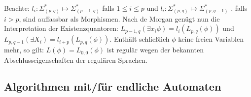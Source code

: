 \documentclass[12pt, a4paper]{article}
\begin{document}
\begin{itemize}
		\subitem Beachte: $l_{i}: \Sigma^{*}_{(p,q)}\mapsto\Sigma^{*}_{(p-1,q)}$ falls $1\leq i\leq p$ und $l_{i}:\Sigma^{*}_{(p,q)}\mapsto\Sigma^{*}_{(p,q-1)}$ , falls $i>p$, sind auffassbar als Morphismen.
		\subitem Nach de Morgan genügt nun die Interpretation der Existenzquantoren:
		$L_{p-1,q}(\exists x_{i}\phi)=l_{i}(L_{p,q}(\phi))$ und $L_{p,q-1}(\exists X_{i})=l_{i+p}(L_{p,q}(\phi)).$
		Enthält schließlich $\phi$ keine freien Variablen mehr, so gilt: $L(\phi)=L_{0,0}(\phi)$ ist
		regulär wegen der bekannten Abschlusseigenschaften der regulären Sprachen.
		
	\end{itemize}
	\subsection{Algorithmen mit/für endliche Automaten}
\end{document}
